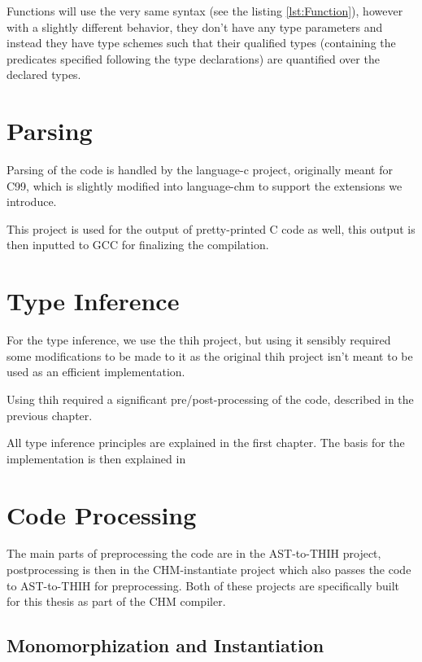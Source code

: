 Functions will use the very same syntax (see the listing \ref{lst:Function}), however with a slightly different behavior, they don't have any type parameters and instead they have type schemes such that their qualified types (containing the predicates specified following the type declarations) are quantified over the declared types.

\section{Parsing}

Parsing of the code is handled by the language-c project, originally meant for C99, which is slightly modified into language-chm to support the extensions we introduce. %

This project is used for the output of pretty-printed C code as well, this output is then inputted to GCC for finalizing the compilation.

\section{Type Inference}

For the type inference, we use the thih project, %
but using it sensibly required some modifications to be made to it as the original thih project isn't meant to be used as an efficient implementation.

Using thih required a significant pre/post-processing of the code, described in the previous chapter. %

All type inference principles are explained in the first chapter. The basis for the implementation is then explained in %

\section{Code Processing}

The main parts of preprocessing the code are in the AST-to-THIH project, postprocessing is then in the CHM-instantiate project which also passes the code to AST-to-THIH for preprocessing. Both of these projects are specifically built for this thesis as part of the CHM compiler.

\subsection{Monomorphization and Instantiation} %

